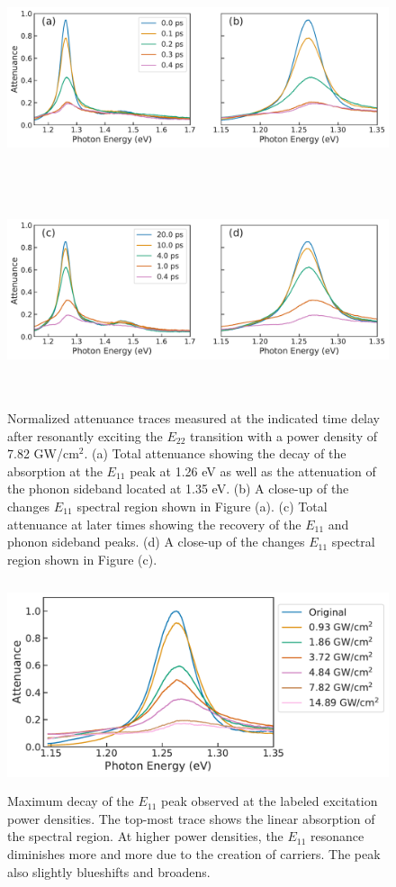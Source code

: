 \begin{figure}[H]
	\centering
	{\includegraphics[height=2.4in]{images/chapter_my_data/Weilu_CNT_4mW_E11_decay} }
	{\includegraphics[height=2.4in]{images/chapter_my_data/Weilu_CNT_4mW_E11_recovery} }
	\caption{Normalized attenuance traces measured at the indicated time delay after resonantly exciting the $E_{22}$ transition with a power density of 7.82 GW/cm$^2$. (a) Total attenuance showing the decay of the absorption at the $E_{11}$ peak at 1.26 eV as well as the attenuation of the phonon sideband located at 1.35 eV. (b) A close-up of the changes $E_{11}$ spectral region shown in Figure (a). (c) Total attenuance at later times showing the recovery of the $E_{11}$ and phonon sideband peaks. (d) A close-up of the changes $E_{11}$ spectral region shown in Figure (c).}
	\label{fig:weilu_cnt_time_traces}
\end{figure}

\begin{figure}[ht]
	\centering
	\includegraphics[height=2.4in]{images/chapter_my_data/Weilu_CNT_abs_max_change}
	\caption{Maximum decay of the $E_{11}$ peak observed at the labeled excitation power densities. The top-most trace shows the linear absorption of the spectral region. At higher power densities, the $E_{11}$ resonance diminishes more and more due to the creation of carriers. The peak also slightly blueshifts and broadens.}
	\label{fig:weilu_cnt_max_decay}
\end{figure}

